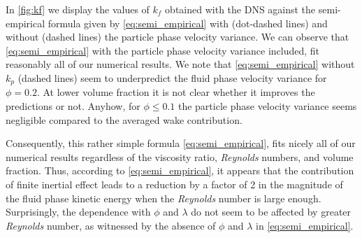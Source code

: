 In  \ref{fig:kf} we display the values of $k_f$ obtained with the DNS against the semi-empirical formula given by \ref{eq:semi_empirical} with (dot-dashed lines) and without (dashed lines) the particle phase velocity variance. 
We can observe that \ref{eq:semi_empirical} with the particle phase velocity variance included, fit reasonably all of our numerical results. 
We note that \ref{eq:semi_empirical} without $k_p$ (dashed lines) seem to underpredict the fluid phase velocity variance for $\phi = 0.2$. 
At lower volume fraction it is not clear whether it improves the predictions or not. 
Anyhow, for $\phi \le 0.1$ the particle phase velocity variance seems negligible compared to the averaged wake contribution. 

Consequently, this rather simple formula \eqref{eq:semi_empirical},  fits nicely all of our numerical results regardless of the viscosity ratio, \textit{Reynolds} numbers, and volume fraction.  
Thus, according to \ref{eq:semi_empirical}, it appears that the contribution of finite inertial effect leads to a reduction by a factor of 2 in the magnitude of the fluid phase kinetic energy when the \textit{Reynolds} number is large enough. 
Surprisingly, the dependence with $\phi$ and $\lambda$ do not seem to be affected by greater \textit{Reynolds} number, as witnessed by the absence of $\phi$ and $\lambda$ in \ref{eq:semi_empirical}. 
